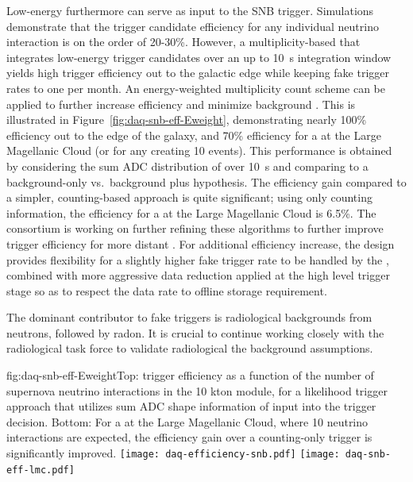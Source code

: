 Low-energy  furthermore can serve as input to the
SNB trigger. Simulations demonstrate that the trigger candidate
efficiency for any individual  neutrino interaction is on the order
of 20-30\%. However, a multiplicity-based 
 that integrates low-energy trigger candidates over an up to \SI{10}{\second}
integration window yields high trigger efficiency out to the
galactic edge while keeping fake  trigger rates to one per
month. An energy-weighted multiplicity count scheme can be
applied to further increase efficiency and minimize background
\cite{bib:docdb14522}. This is illustrated in
Figure~\ref{fig:daq-snb-eff-Eweight}, demonstrating nearly 100\% efficiency
out to the edge of the galaxy, and 70\% efficiency for a  at
the Large Magellanic Cloud (or for any  creating 10
events). This performance is obtained by considering the sum ADC
distribution of  over \SI{10}{\second} and comparing to a background-only
vs.~background plus  hypothesis. The efficiency gain compared to a
simpler,  counting-based approach is quite significant; using
only counting information, the efficiency for a  at
the Large Magellanic Cloud is 6.5\%. The 
consortium is working on further refining these algorithms to further improve
 trigger efficiency for more distant . For
additional efficiency increase, the design provides flexibility
for a slightly higher fake  trigger rate to be handled by
the , combined with more aggressive data reduction
applied at the high level trigger stage so as to respect the data rate to
offline storage requirement.

The dominant contributor to fake  triggers is
radiological backgrounds from neutrons, followed by radon. It is
crucial to continue working closely with the radiological task force
to validate radiological the background assumptions.

\begin{dunefigure}{fig:daq-snb-eff-Eweight}{Top:  trigger 
    efficiency as a function of the number of supernova neutrino
    interactions in the 10 kton module, for a likelihood trigger
    approach that utilizes sum ADC shape information of
     input into the trigger decision. Bottom:
    For a  at the Large Magellanic Cloud, where 10 neutrino
  interactions are expected, the efficiency gain over a counting-only
  trigger is significantly improved. }
 \texttt{[image: daq-efficiency-snb.pdf]}%
 \texttt{[image: daq-snb-eff-lmc.pdf]}%
\end{dunefigure}

